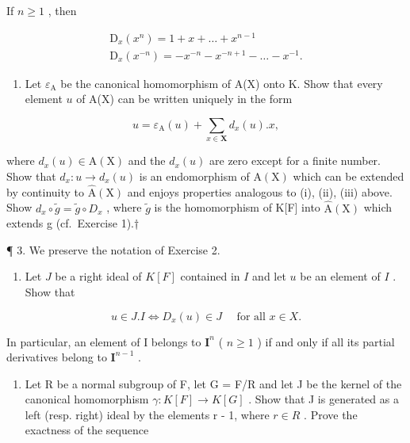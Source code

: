 If \(n\geqslant 1\) , then

\[
\begin{array}{c} \mathrm{D} _ {x} (x ^ {n}) = 1 + x + \dots + x ^ {n - 1} \\ \mathrm{D} _ {x} (x ^ {- n}) = - x ^ {- n} - x ^ {- n + 1} - \dots - x ^ {- 1}. \end{array}
\]

\begin{enumerate}
\def\labelenumi{(\alph{enumi})}
\setcounter{enumi}{3}
\tightlist
\item
  Let \(\varepsilon_{\mathrm{A}}\) be the canonical homomorphism of A(X) onto K. Show that every element \(u\) of A(X) can be written uniquely in the form
\end{enumerate}

\[
u = \varepsilon_ {\mathrm{A}} (u) + \sum_ {x \in \mathbf {X}} d _ {x} (u). x,
\]

where \(d_{x}(u) \in \mathrm{A}(\mathrm{X})\) and the \(d_{x}(u)\) are zero except for a finite number. Show that \(d_{x}: u \to d_{x}(u)\) is an endomorphism of \(\mathrm{A}(\mathrm{X})\) which can be extended by continuity to \(\hat{\mathrm{A}}(\mathrm{X})\) and enjoys properties analogous to (i), (ii), (iii) above. Show \(d_{x} \circ \tilde{g} = \tilde{g} \circ D_{x}\) , where \(\tilde{g}\) is the homomorphism of K{[}F{]} into \(\hat{\mathrm{A}}(\mathrm{X})\) which extends g (cf.~Exercise 1).†

¶ 3. We preserve the notation of Exercise 2.

\begin{enumerate}
\def\labelenumi{(\alph{enumi})}
\tightlist
\item
  Let \(J\) be a right ideal of \(K[F]\) contained in \(I\) and let \(u\) be an element of \(I\) . Show that
\end{enumerate}

\[
u \in J. I \Leftrightarrow D _ {x} (u) \in J \quad \text { for   all } x \in X.
\]

In particular, an element of I belongs to \(\mathbf{I}^n\) ( \(n \geqslant 1\) ) if and only if all its partial derivatives belong to \(\mathbf{I}^{n-1}\) .


\begin{enumerate}
\def\labelenumi{(\alph{enumi})}
\setcounter{enumi}{1}
\tightlist
\item
  Let R be a normal subgroup of F, let G = F/R and let J be the kernel of the canonical homomorphism \(\gamma: K[F] \to K[G]\) . Show that J is generated as a left (resp. right) ideal by the elements r - 1, where \(r \in R\) . Prove the exactness of the sequence
\end{enumerate}

